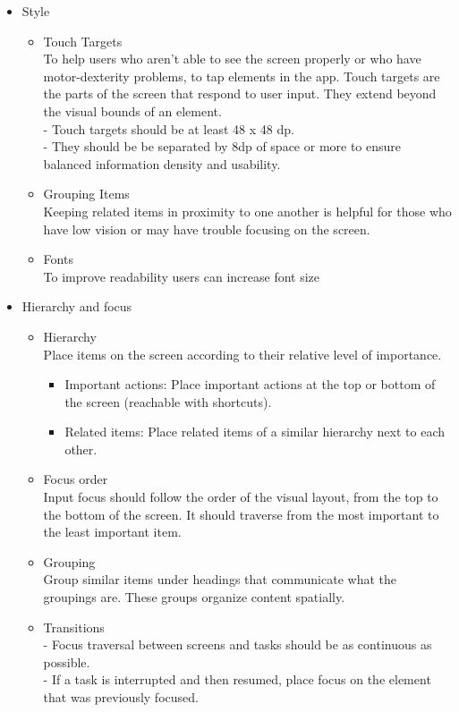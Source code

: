 \begin{itemize}
    \item{Style}
    	\begin{itemize}
        	\item{Touch Targets\\To help users who aren't able to see the screen properly or who have motor-dexterity problems, to tap elements in the app. Touch targets are the parts of the screen that respond to user input. They extend beyond the visual bounds of an element. \\- Touch targets should be at least 48 x 48 dp. \\- They should be be separated by 8dp of space or more to ensure balanced information density and usability. }
            \item{Grouping Items\\Keeping related items in proximity to one another is helpful for those who have low vision or may have trouble focusing on the screen.}
            \item{Fonts\\To improve readability users can increase font size}
        \end{itemize}
    \item{Hierarchy and focus}
    	\begin{itemize}
        	\item{Hierarchy\\Place items on the screen according to their relative level of importance.}
            \begin{itemize}
            	\item{Important actions: Place important actions at the top or bottom of the screen (reachable with shortcuts).}
                \item{Related items: Place related items of a similar hierarchy next to each other.}
            \end{itemize}
            \item{Focus order\\Input focus should follow the order of the visual layout, from the top to the bottom of the screen. It should traverse from the most important to the least important item.}
            \item{Grouping\\Group similar items under headings that communicate what the groupings are. These groups organize content spatially.}
            \item{Transitions\\
- Focus traversal between screens and tasks should be as continuous as possible.\\
- If a task is interrupted and then resumed, place focus on the element that was previously focused.}


\end{itemize}
\end{itemize}

